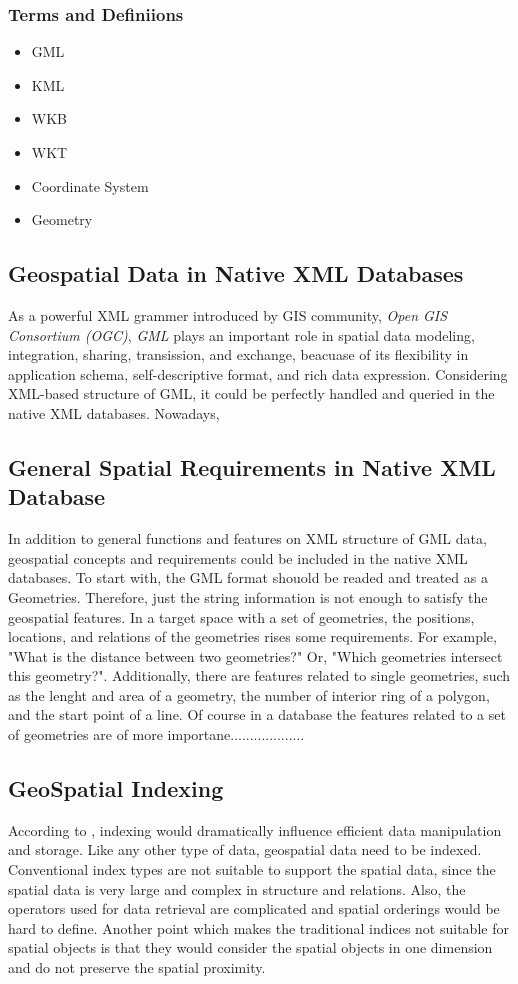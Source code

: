 \documentclass[a4paper,12pt]{article}
\begin{document}
\subsubsection{Terms and Definiions}

\begin{itemize}
\item GML
\item KML
\item WKB
\item WKT
\item Coordinate System
\item Geometry
\end{itemize}

\subsection{Geospatial Data in Native XML Databases}
As a powerful XML grammer introduced by GIS community, \textit{Open GIS Consortium (OGC)}, \textit{GML} plays an important role in spatial data modeling, integration, sharing, transission, and exchange, beacuase of its flexibility in application schema, self-descriptive format, and rich data expression. Considering XML-based structure of GML, it could be perfectly handled and queried in the native XML databases. Nowadays, 

\subsection{General Spatial Requirements in Native XML Database}
In addition to general functions and features on XML structure of GML data, geospatial concepts and requirements could be included in the native XML databases. To start with, the GML format shouold be readed and treated as a Geometries. Therefore, just the string information is not enough to satisfy the geospatial features. In a target space with a set of geometries, the positions, locations, and relations of the geometries rises some requirements. For example, "What is the distance between two geometries?" Or, "Which geometries intersect this geometry?". Additionally, there are features related to single geometries, such as the lenght and area of a geometry, the number of interior ring of a polygon, and the start point of a line. Of course in a database the features related to a set of geometries are of more importane...................

\subsection{GeoSpatial Indexing}
According to \cite{survey}, indexing would dramatically influence efficient data manipulation and storage. Like any other type of data, geospatial data need to be indexed. Conventional index types are not suitable to support the spatial data, since the spatial data is very large and complex in structure and relations. Also, the operators used for data retrieval are complicated and spatial orderings would be hard to define. Another point which makes the traditional indices not suitable for spatial objects is that they would consider the spatial objects in one dimension and do not preserve the spatial proximity.
\end{document}
